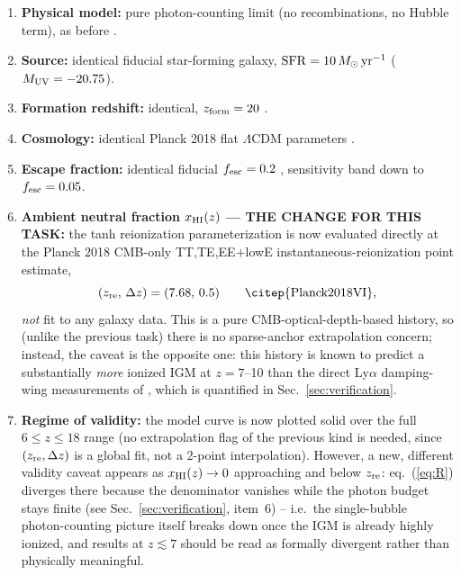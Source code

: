 \documentclass[11pt,a4paper]{article}
\newcommand{\Msun}{\,M_\odot}
\begin{document}
\begin{enumerate}
\item \textbf{Physical model:} pure photon-counting limit (no recombinations, no Hubble term), as before
      \citep{Cen2000,ShapiroGiroux1987}.
\item \textbf{Source:} identical fiducial star-forming galaxy, $\mathrm{SFR}=10\Msun\,{\rm yr^{-1}}$
      ($M_{\rm UV}=-20.75$).
\item \textbf{Formation redshift:} identical, $z_{\rm form}=20$ \citep{Kitayama2004}.
\item \textbf{Cosmology:} identical Planck 2018 flat $\Lambda$CDM parameters \citep{Planck2018VI}.
\item \textbf{Escape fraction:} identical fiducial $f_{\rm esc}=0.2$ \citep{Robertson2015}, sensitivity band
      down to $f_{\rm esc}=0.05$.
\item \textbf{Ambient neutral fraction $x_{\rm HI}(z)$ --- THE CHANGE FOR THIS TASK:} the tanh
      reionization parameterization is now evaluated directly at the Planck 2018 CMB-only
      TT,TE,EE$+$lowE instantaneous-reionization point estimate,
      \begin{equation}
        (z_{\rm re},\,\Delta z) = (7.68,\,0.5) \qquad \text{\citep{Planck2018VI}},
        \label{eq:planckpars}
      \end{equation}
      \emph{not} fit to any galaxy data. This is a pure CMB-optical-depth-based history, so (unlike the
      previous task) there is no sparse-anchor extrapolation concern; instead, the caveat is the opposite
      one: this history is known to predict a substantially \emph{more} ionized IGM at $z=7$--10 than the
      direct Ly$\alpha$ damping-wing measurements of \citet{Umeda2023}, which is quantified in
      Sec.~\ref{sec:verification}.
\item \textbf{Regime of validity:} the model curve is now plotted solid over the full $6\le z\le18$ range
      (no extrapolation flag of the previous kind is needed, since $(z_{\rm re},\Delta z)$ is a global fit,
      not a 2-point interpolation). However, a new, different validity caveat appears as $x_{\rm HI}(z)\to0$
      approaching and below $z_{\rm re}$: eq.~(\ref{eq:R}) diverges there because the denominator vanishes
      while the photon budget stays finite (see Sec.~\ref{sec:verification}, item~6) -- i.e.\ the
      single-bubble photon-counting picture itself breaks down once the IGM is already highly ionized, and
      results at $z\lesssim7$ should be read as formally divergent rather than physically meaningful.
\end{enumerate}
\end{document}
